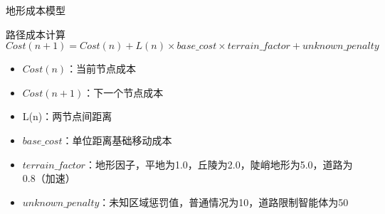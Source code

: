 \documentclass[
10pt,
aspectratio=169,
]{beamer}
\begin{document}
\begin{frame}{地形成本模型}
    \begin{block}{路径成本计算}
        \begin{equation}
           Cost(n+1) = Cost(n) + L(n) \times base\_cost \times terrain\_factor + unknown\_penalty
        \end{equation}
    \end{block}

    \begin{itemize}
        \item $Cost(n)$：当前节点成本
\item $Cost(n+1)$：下一个节点成本
\item L(n)：两节点间距离
\item $base\_cost$：单位距离基础移动成本
\item $terrain\_factor$：地形因子，平地为1.0，丘陵为2.0，陡峭地形为5.0，道路为0.8（加速）
\item $unknown\_penalty$：未知区域惩罚值，普通情况为10，道路限制智能体为50
\end{itemize}

\end{frame}
\end{document}
